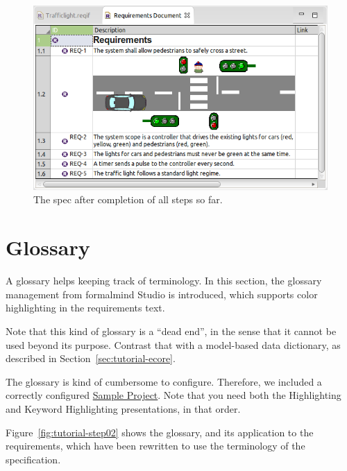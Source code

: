\begin{figure}[h!]
  \centering
  \includegraphics[width=\linewidth]{../se-images/tutorial-step01.png}
  \caption{The spec after completion of all steps so far.}
  \label{fig:tutorial-step01}
\end{figure}

\section{Glossary}
\label{sec:tutorial-glossary}

A glossary helps keeping track of terminology.  In this section, the glossary management from formalmind Studio is introduced, which supports color highlighting in the requirements text.

Note that this kind of glossary is a ``dead end'', in the sense that it cannot be used beyond its purpose.  Contrast that with a model-based data dictionary, as described in Section~\ref{sec:tutorial-ecore}.

The glossary is kind of cumbersome to configure.   Therefore, we included a correctly configured \href{../se-materials/tutorial/tdse-2/}{Sample Project}.  Note that you need both the Highlighting and Keyword Highlighting presentations, in that order.

Figure~\ref{fig:tutorial-step02} shows the glossary, and its application to the requirements, which have been rewritten to use the terminology of the specification.

